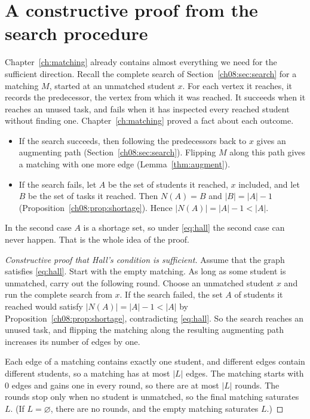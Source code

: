 \section{A constructive proof from the search procedure}\label{ch09:sec:constructive}
Chapter~\ref{ch:matching} already contains almost everything we need for the sufficient direction. Recall the complete search of Section~\ref{ch08:sec:search} for a matching $M$, started at an unmatched student $x$. For each vertex it reaches, it records the predecessor, the vertex from which it was reached. It succeeds when it reaches an unused task, and fails when it has inspected every reached student without finding one. Chapter~\ref{ch:matching} proved a fact about each outcome.
\begin{itemize}
\item If the search succeeds, then following the predecessors back to $x$ gives an augmenting path (Section~\ref{ch08:sec:search}). Flipping $M$ along this path gives a matching with one more edge (Lemma~\ref{thm:augment}).
\item If the search fails, let $A$ be the set of students it reached, $x$ included, and let $B$ be the set of tasks it reached. Then $N(A)=B$ and $|B|=|A|-1$ (Proposition~\ref{ch08:prop:shortage}). Hence $|N(A)|=|A|-1<|A|$.
\end{itemize}
In the second case $A$ is a shortage set, so under \eqref{eq:hall} the second case can never happen. That is the whole idea of the proof.

\begin{proof}[Constructive proof that Hall's condition is sufficient]
Assume that the graph satisfies \eqref{eq:hall}. Start with the empty matching. As long as some student is unmatched, carry out the following round. Choose an unmatched student $x$ and run the complete search from $x$. If the search failed, the set $A$ of students it reached would satisfy $|N(A)|=|A|-1<|A|$ by Proposition~\ref{ch08:prop:shortage}, contradicting \eqref{eq:hall}. So the search reaches an unused task, and flipping the matching along the resulting augmenting path increases its number of edges by one.

Each edge of a matching contains exactly one student, and different edges contain different students, so a matching has at most $|L|$ edges. The matching starts with $0$ edges and gains one in every round, so there are at most $|L|$ rounds. The rounds stop only when no student is unmatched, so the final matching saturates $L$. (If $L=\varnothing$, there are no rounds, and the empty matching saturates $L$.)
\end{proof}

